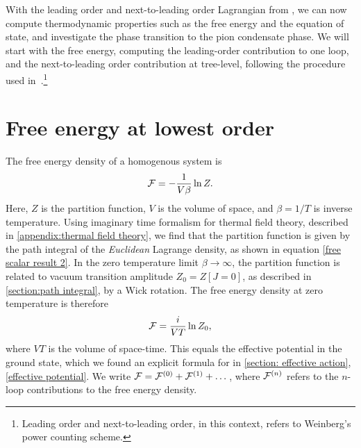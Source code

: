 With the leading order and next-to-leading order Lagrangian from \chpt, we can now compute thermodynamic properties such as the free energy and the equation of state, and investigate the phase transition to the pion condensate phase.
We will start with the free energy, computing the leading-order contribution to one loop, and the next-to-leading order contribution at tree-level, following the procedure used in~\cite{mojahed, Andersen:two-flavor-chpt}.\footnote{Leading order and next-to-leading order, in this context, refers to Weinberg's power counting scheme.}

\section{Free energy at lowest order}
\label{section: free energy at lowest order}

The free energy density of a homogenous system is
\begin{equation}
    \mathcal{F} = - \frac{1}{V \beta} \ln Z.
\end{equation}
Here, $Z$ is the partition function, $V$ is the volume of space, and $\beta = 1/T$ is inverse temperature.
Using imaginary time formalism for thermal field theory, described in \autoref{appendix:thermal field theory}, we find that the partition function is given by the path integral of the \emph{Euclidean} Lagrange density, as shown in equation \cref{free scalar result 2}.
In the zero temperature limit $\beta \rightarrow \infty$, the partition function is related to vacuum transition amplitude $Z_0 = Z[J=0]$, as described in \autoref{section:path integral}, by a Wick rotation.
The free energy density at zero temperature is therefore 
\begin{equation}
    \mathcal{F} = \frac{i}{VT} \ln Z_0,
\end{equation}
where $VT$ is the volume of space-time.
This equals the effective potential in the ground state, which we found an explicit formula for in \autoref{section: effective action}, \cref{effective potential}.
We write $\mathcal{F} = \mathcal{F}^{(0)} + \mathcal{F}^{(1)} + \dots$, where $\mathcal{F}^{(n)}$ refers to the $n$-loop contributions to the free energy density.

